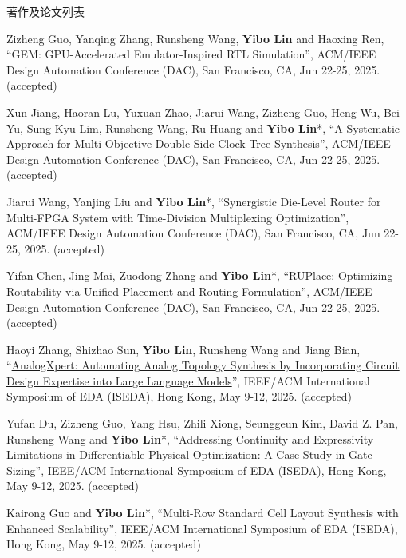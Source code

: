 \begin{rSection}{著作及论文列表}
\begin{description}[font=\normalfont, rightmargin=2em]
\item[{[C182]}]{
        Zizheng Guo, Yanqing Zhang, Runsheng Wang, \textbf{Yibo Lin} and Haoxing Ren, 
    ``GEM: GPU-Accelerated Emulator-Inspired RTL Simulation'', 
    ACM/IEEE Design Automation Conference (DAC), San Francisco, CA, Jun 22-25, 2025.
    (accepted)
}
            

\item[{[C181]}]{
        Xun Jiang, Haoran Lu, Yuxuan Zhao, Jiarui Wang, Zizheng Guo, Heng Wu, Bei Yu, Sung Kyu Lim, Runsheng Wang, Ru Huang and \textbf{Yibo Lin}*, 
    ``A Systematic Approach for Multi-Objective Double-Side Clock Tree Synthesis'', 
    ACM/IEEE Design Automation Conference (DAC), San Francisco, CA, Jun 22-25, 2025.
    (accepted)
}
            

\item[{[C180]}]{
        Jiarui Wang, Yanjing Liu and \textbf{Yibo Lin}*, 
    ``Synergistic Die-Level Router for Multi-FPGA System with Time-Division Multiplexing Optimization'', 
    ACM/IEEE Design Automation Conference (DAC), San Francisco, CA, Jun 22-25, 2025.
    (accepted)
}
            

\item[{[C179]}]{
        Yifan Chen, Jing Mai, Zuodong Zhang and \textbf{Yibo Lin}*, 
    ``RUPlace: Optimizing Routability via Unified Placement and Routing Formulation'', 
    ACM/IEEE Design Automation Conference (DAC), San Francisco, CA, Jun 22-25, 2025.
    (accepted)
}
            

\item[{[C178]}]{
        Haoyi Zhang, Shizhao Sun, \textbf{Yibo Lin}, Runsheng Wang and Jiang Bian, 
    ``\href{https://arxiv.org/abs/2412.19824}{AnalogXpert: Automating Analog Topology Synthesis by Incorporating Circuit Design Expertise into Large Language Models}'', 
    IEEE/ACM International Symposium of EDA (ISEDA), Hong Kong, May 9-12, 2025.
    (accepted)
}
            

\item[{[C177]}]{
        Yufan Du, Zizheng Guo, Yang Hsu, Zhili Xiong, Seunggeun Kim, David Z. Pan, Runsheng Wang and \textbf{Yibo Lin}*, 
    ``Addressing Continuity and Expressivity Limitations in Differentiable Physical Optimization: A Case Study in Gate Sizing'', 
    IEEE/ACM International Symposium of EDA (ISEDA), Hong Kong, May 9-12, 2025.
    (accepted)
}
            

\item[{[C176]}]{
        Kairong Guo and \textbf{Yibo Lin}*, 
    ``Multi-Row Standard Cell Layout Synthesis with Enhanced Scalability'', 
    IEEE/ACM International Symposium of EDA (ISEDA), Hong Kong, May 9-12, 2025.
    (accepted)
}
            


\end{description}
\end{rSection}
